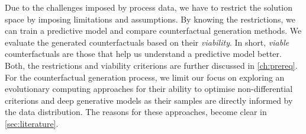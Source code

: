 \documentclass[./../../paper.tex]{subfiles}
\begin{document}
Due to the challenges imposed by process data, we have to restrict the solution space by imposing limitations and assumptions. 
By knowing the restrictions, we can train a predictive model and compare counterfactual generation methods. 
We evaluate the generated counterfactuals based on their \emph{viability}. In short, \emph{viable} counterfactuals are those that help us understand a predictive model better.
Both, the restrictions and viability criterions are further discussed in \autoref{ch:prereq}. 
For the counterfactual generation process, we limit our focus on exploring an evolutionary computing approaches for their ability to optimise non-differential criterions and deep generative models as their samples are directly informed by the data distribution. 
The reasons for these approaches, become clear in \autoref{sec:literature}.
\end{document}
